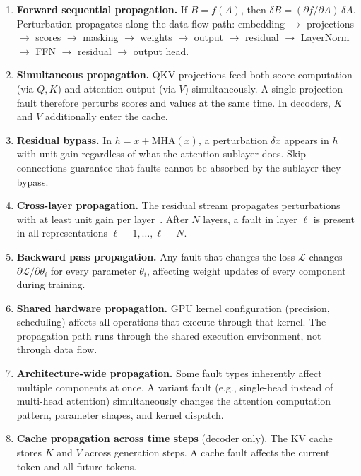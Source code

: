 \begin{enumerate}[nosep]
\item \textbf{Forward sequential propagation.} If $B = f(A)$, then $\delta B = (\partial f / \partial A)\, \delta A$. Perturbation propagates along the data flow path: embedding $\to$ projections $\to$ scores $\to$ masking $\to$ weights $\to$ output $\to$ residual $\to$ LayerNorm $\to$ FFN $\to$ residual $\to$ output head.

\item \textbf{Simultaneous propagation.} QKV projections feed both score computation (via $Q, K$) and attention output (via $V$) simultaneously. A single projection fault therefore perturbs scores and values at the same time. In decoders, $K$ and $V$ additionally enter the cache.

\item \textbf{Residual bypass.} In $h = x + \text{MHA}(x)$, a perturbation $\delta x$ appears in $h$ with unit gain regardless of what the attention sublayer does. Skip connections guarantee that faults cannot be absorbed by the sublayer they bypass.

\item \textbf{Cross-layer propagation.} The residual stream propagates perturbations with at least unit gain per layer~\cite{roquet2024cross}. After $N$ layers, a fault in layer $\ell$ is present in all representations $\ell+1, \ldots, \ell+N$.

\item \textbf{Backward pass propagation.} Any fault that changes the loss $\mathcal{L}$ changes $\partial \mathcal{L} / \partial \theta_i$ for every parameter $\theta_i$, affecting weight updates of every component during training.

\item \textbf{Shared hardware propagation.} GPU kernel configuration (precision, scheduling) affects all operations that execute through that kernel. The propagation path runs through the shared execution environment, not through data flow.

\item \textbf{Architecture-wide propagation.} Some fault types inherently affect multiple components at once. A variant fault (e.g., single-head instead of multi-head attention) simultaneously changes the attention computation pattern, parameter shapes, and kernel dispatch.

\item \textbf{Cache propagation across time steps} (decoder only). The KV cache stores $K$ and $V$ across generation steps. A cache fault affects the current token and all future tokens.
\end{enumerate}

